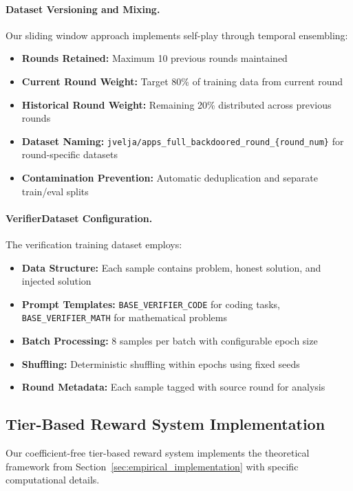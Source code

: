 \paragraph{Dataset Versioning and Mixing.} Our sliding window approach implements self-play through temporal ensembling:
\begin{itemize}
    \item \textbf{Rounds Retained:} Maximum 10 previous rounds maintained
    \item \textbf{Current Round Weight:} Target 80\% of training data from current round
    \item \textbf{Historical Round Weight:} Remaining 20\% distributed across previous rounds
    \item \textbf{Dataset Naming:} \texttt{jvelja/apps\_full\_backdoored\_round\_\{round\_num\}} for round-specific datasets
    \item \textbf{Contamination Prevention:} Automatic deduplication and separate train/eval splits
\end{itemize}

\paragraph{VerifierDataset Configuration.} The verification training dataset employs:
\begin{itemize}
    \item \textbf{Data Structure:} Each sample contains problem, honest solution, and injected solution
    \item \textbf{Prompt Templates:} \texttt{BASE\_VERIFIER\_CODE} for coding tasks, \texttt{BASE\_VERIFIER\_MATH} for mathematical problems
    \item \textbf{Batch Processing:} 8 samples per batch with configurable epoch size
    \item \textbf{Shuffling:} Deterministic shuffling within epochs using fixed seeds
    \item \textbf{Round Metadata:} Each sample tagged with source round for analysis
\end{itemize}

\subsection{Tier-Based Reward System Implementation}
\label{sec:reward_implementation}

Our coefficient-free tier-based reward system implements the theoretical framework from Section~\ref{sec:empirical_implementation} with specific computational details.

